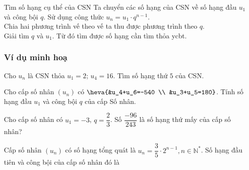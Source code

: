 \begin{dang}{Tìm số hạng cụ thể của CSN}
	Ta chuyển các số hạng của CSN về số hạng đầu $u_1$ và công bội $q$. Sử dụng công thức $u_n=u_1\cdot q^{n-1}$. \\
	Chia hai phương trình vế theo vế ta thu được phương trình theo $q$. \\
	Giải tìm $q$ và $u_1$. Từ đó tìm được số hạng cần tìm thỏa ycbt.
\end{dang}
\subsubsection{Ví dụ minh hoạ}
\begin{vd}%
	Cho $u_n$ là CSN thỏa $u_1=2$; $u_4=16$. Tìm số hạng thứ $5$ của CSN.
\end{vd}
\begin{vd}%
	Cho cấp số nhân $(u_n)$ có $\heva{&u_4+u_6=-540 \\ &u_3+u_5=180}$. Tính số hạng đầu $u_1$ và công bội $q$ của cấp Số nhân.
\end{vd}
\begin{vd}%
	Cho cấp số nhân có $u_1=-3$, $q=\dfrac{2}{3}$. Số $\dfrac{-96}{243}$ là số hạng thứ mấy của cấp số nhân?
\end{vd}
\begin{vd}%
	Cấp số nhân $\left(u_{n}\right)$ có số hạng tổng quát là $u_n=\dfrac{3}{5} \cdot 2^{n-1}, n \in \mathbb{N}^*$. Số hạng đầu tiên và công bội của cấp số nhân đó là
\end{vd}

